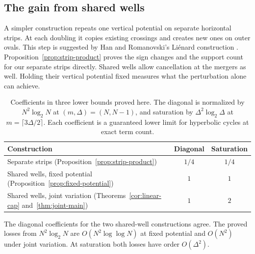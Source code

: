 \subsection{The gain from shared wells}\label{sec:related-budgets}
A simpler construction repeats one vertical potential on separate horizontal strips. At each doubling it copies existing crossings and creates new ones on outer ovals. This step is suggested by Han and Romanovski's Li\'enard construction \cite[Theorem~2.1]{HanRomanovski}. Proposition~\ref{prop:strip-product} proves the sign changes and the support count for our separate strips directly. Shared wells allow cancellation at the mergers as well. Holding their vertical potential fixed measures what the perturbation alone can achieve.

\begin{table}[!htbp]\centering\small
\caption{Coefficients in three lower bounds proved here. The diagonal is normalized by \(N^2\log_2N\) at \((m,\Delta)=(N,N-1)\), and saturation by \(\Delta^2\log_2\Delta\) at \(m=\lceil3\Delta/2\rceil\). Each coefficient is a guaranteed lower limit for hyperbolic cycles at exact term count.}\label{tab:mechanism-breakdown}
\begin{tabular}{@{}lcc@{}}\toprule
Construction & Diagonal & Saturation\\\midrule
Separate strips (Proposition~\ref{prop:strip-product}) & \(1/4\) & \(1/4\)\\
Shared wells, fixed potential (Proposition~\ref{prop:fixed-potential}) & \(1\) & \(1\)\\
Shared wells, joint variation (Theorems~\ref{cor:linear-cap} and~\ref{thm:joint-main}) & \(1\) & \(2\)\\
\bottomrule\end{tabular}
\end{table}
The diagonal coefficients for the two shared-well constructions agree. The proved losses from \(N^2\log_2N\) are \(O(N^2\log\log N)\) at fixed potential and \(O(N^2)\) under joint variation. At saturation both losses have order \(O(\Delta^2)\).
\FloatBarrier
